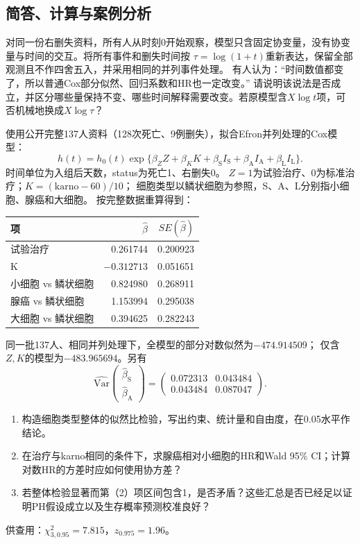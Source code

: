 \subsection{简答、计算与案例分析}

对同一份右删失资料，所有人从时刻0开始观察，模型只含固定协变量，没有协变量与时间的交互。将所有事件和删失时间按
$\tau=\log(1+t)$重新表达，保留全部观测且不作四舍五入，并采用相同的并列事件处理。
有人认为：“时间数值都变了，所以普通Cox部分似然、回归系数和HR也一定改变。”
请说明该说法是否成立，并区分哪些量保持不变、哪些时间解释需要改变。若原模型含$X\log t$项，可否机械地换成$X\log\tau$？

使用公开完整137人资料（128次死亡、9例删失），拟合Efron并列处理的Cox模型：
\[
h(t)=h_0(t)\exp\{\beta_Z Z+\beta_K K+
\beta_{\mathrm S}I_{\mathrm S}+
\beta_{\mathrm A}I_{\mathrm A}+
\beta_{\mathrm L}I_{\mathrm L}\}.
\]
时间单位为入组后天数，status为死亡1、右删失0。
$Z=1$为试验治疗、$0$为标准治疗；$K=(\mathrm{karno}-60)/10$；
细胞类型以鳞状细胞为参照，S、A、L分别指小细胞、腺癌和大细胞。
按完整数据重算得到：
\begin{center}\begin{tabular}{lrr}\toprule
项 & $\widehat\beta$ & $SE(\widehat\beta)$\\\midrule
试验治疗 & 0.261744 & 0.200923\\
K & $-0.312713$ & 0.051651\\
小细胞 vs 鳞状细胞 & 0.824980 & 0.268911\\
腺癌 vs 鳞状细胞 & 1.153994 & 0.295038\\
大细胞 vs 鳞状细胞 & 0.394625 & 0.282243\\\bottomrule
\end{tabular}\end{center}
同一批137人、相同并列处理下，全模型的部分对数似然为$-474.914509$；
仅含$Z,K$的模型为$-483.965694$。另有
\[
\widehat{\mathrm{Var}}
\begin{pmatrix}\widehat\beta_{\mathrm S}\\\widehat\beta_{\mathrm A}\end{pmatrix}
=
\begin{pmatrix}
0.072313&0.043484\\
0.043484&0.087047
\end{pmatrix}.
\]
\begin{enumerate}
\item 构造细胞类型整体的似然比检验，写出约束、统计量和自由度，在0.05水平作结论。
\item 在治疗与karno相同的条件下，求腺癌相对小细胞的HR和Wald 95\% CI；计算对数HR的方差时应如何使用协方差？
\item 若整体检验显著而第（2）项区间包含1，是否矛盾？这些汇总是否已经足以证明PH假设成立以及生存概率预测校准良好？
\end{enumerate}
供查用：$\chi^2_{3,0.95}=7.815$，$z_{0.975}=1.96$。

